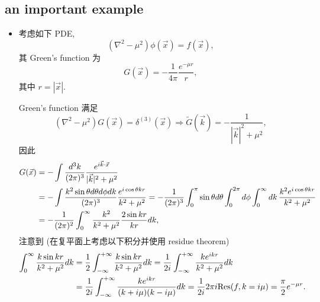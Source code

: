 \subsection{an important example} \label{subsection A.2.1}
\begin{itemize}
	\item 考虑如下 PDE,
	\begin{equation}
		(\nabla^2 - \mu^2) \phi(\vec{x}) = f(\vec{x}),
	\end{equation}
	其 Green's function 为
	\begin{equation}
		G(\vec{x}) = - \frac{1}{4 \pi} \frac{e^{- \mu r}}{r},
	\end{equation}
	其中 $r = |\vec{x}|$.
	
	\begin{tcolorbox}[title=calculation:]
		Green's function 满足
		\begin{equation}
			(\nabla^2 - \mu^2) G(\vec{x}) = \delta^{(3)}(\vec{x}) \Longrightarrow \tilde{G}(\vec{k}) = - \frac{1}{|\vec{k}|^2 + \mu^2},
		\end{equation}
		因此
		\begin{align}
			G(\vec{x}) &= - \int \frac{d^3 k}{(2 \pi)^3} \frac{e^{i \vec{k} \cdot \vec{x}}}{|\vec{k}|^2 + \mu^2} \notag \\
			&= - \int \frac{k^2 \sin \theta d\theta d\phi dk}{(2 \pi)^3} \frac{e^{i \cos \theta k r}}{k^2 + \mu^2} = - \frac{1}{(2 \pi)^3} \int_0^\pi \sin \theta d\theta \int_0^{2 \pi} d\phi \int_0^\infty dk \, \frac{k^2 e^{i \cos \theta k r}}{k^2 + \mu^2} \notag \\
			&= - \frac{1}{(2 \pi)^2} \int_0^\infty \frac{k^2}{k^2 + \mu^2} \frac{2 \sin k r}{k r} dk,
		\end{align}
		注意到 (在复平面上考虑以下积分并使用 residue theorem)
		\begin{align}
			\int_0^\infty \frac{k \sin k r}{k^2 + \mu^2} dk &= \frac{1}{2} \int_{- \infty}^{+ \infty} \frac{k \sin k r}{k^2 + \mu^2} dk = \frac{1}{2 i} \int_{- \infty}^{+ \infty} \frac{k e^{i k r}}{k^2 + \mu^2} dk \notag \\
			&= \frac{1}{2 i} \int_{- \infty}^{+ \infty} \frac{k e^{i k r}}{(k + i \mu) (k - i \mu)} dk = \frac{1}{2 i} 2 \pi i {\rm Res}(f, k = i \mu) = \frac{\pi}{2} e^{- \mu r}.
		\end{align}
	\end{tcolorbox}
\end{itemize}
